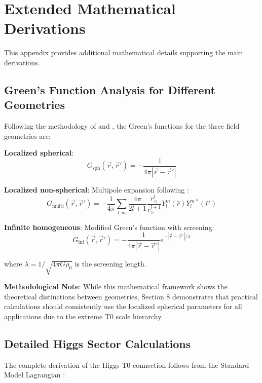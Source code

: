 \documentclass[12pt,a4paper]{article}
\begin{document}
	\section{Extended Mathematical Derivations}
	\label{app:extended_derivations}
	
	This appendix provides additional mathematical details supporting the main derivations.
	
	\subsection{Green's Function Analysis for Different Geometries}
	\label{app:greens_functions}
	
	Following the methodology of \citet{jackson1998} and \citet{duffy2001}, the Green's functions for the three field geometries are:
	
	\textbf{Localized spherical}: 
	\begin{equation}
		G_{\text{sph}}(\vec{r},\vec{r}') = -\frac{1}{4\pi|\vec{r}-\vec{r}'|}
	\end{equation}
	
	\textbf{Localized non-spherical}: Multipole expansion following \citet{jackson1998}:
	\begin{equation}
		G_{\text{multi}}(\vec{r},\vec{r}') = -\frac{1}{4\pi} \sum_{l,m} \frac{4\pi}{2l+1} \frac{r_<^l}{r_>^{l+1}} Y_l^m(\hat{r}) Y_l^{m*}(\hat{r}')
	\end{equation}
	
	\textbf{Infinite homogeneous}: Modified Green's function with screening:
	\begin{equation}
		G_{\text{inf}}(\vec{r},\vec{r}') = -\frac{1}{4\pi|\vec{r}-\vec{r}'|} e^{-|\vec{r}-\vec{r}'|/\lambda}
	\end{equation}
	
	where $\lambda = 1/\sqrt{4\pi G \rho_0}$ is the screening length.
	
	\textbf{Methodological Note}: While this mathematical framework shows the theoretical distinctions between geometries, Section 8 demonstrates that practical calculations should consistently use the localized spherical parameters for all applications due to the extreme T0 scale hierarchy.
	
	\subsection{Detailed Higgs Sector Calculations}
	\label{app:higgs_calculations}
	
	The complete derivation of the Higgs-T0 connection follows from the Standard Model Lagrangian \citep{weinberg2003,peskin1995}:
	
\end{document}
